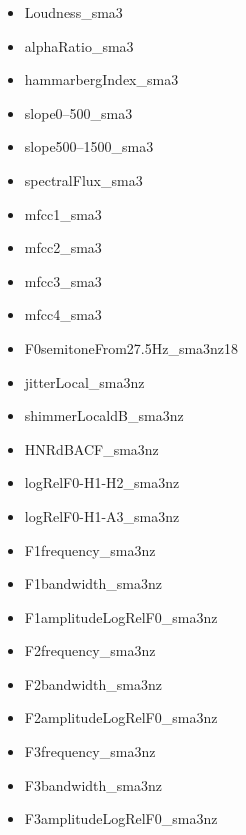 \begin{itemize}
    \item Loudness\_sma3
    \item alphaRatio\_sma3
    \item hammarbergIndex\_sma3
    \item slope0--500\_sma3
    \item slope500--1500\_sma3
    \item spectralFlux\_sma3
    \item mfcc1\_sma3
    \item mfcc2\_sma3
    \item mfcc3\_sma3
    \item mfcc4\_sma3
    \item F0semitoneFrom27.5Hz\_sma3nz18
    \item jitterLocal\_sma3nz
    \item shimmerLocaldB\_sma3nz
    \item HNRdBACF\_sma3nz
    \item logRelF0-H1-H2\_sma3nz
    \item logRelF0-H1-A3\_sma3nz
    \item F1frequency\_sma3nz
    \item F1bandwidth\_sma3nz
    \item F1amplitudeLogRelF0\_sma3nz
    \item F2frequency\_sma3nz
    \item F2bandwidth\_sma3nz
    \item F2amplitudeLogRelF0\_sma3nz
    \item F3frequency\_sma3nz
    \item F3bandwidth\_sma3nz
    \item F3amplitudeLogRelF0\_sma3nz
\end{itemize}
